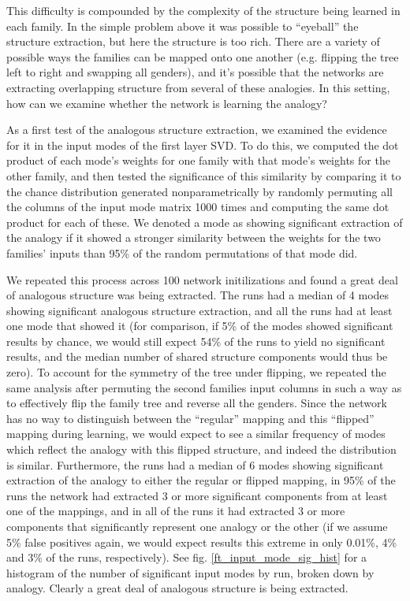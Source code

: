 \documentclass[10pt,letterpaper]{article}
\begin{document}
This difficulty is compounded by the complexity of the structure being learned in each family. In the simple problem above it was possible to ``eyeball'' the structure extraction, but here the structure is too rich. There are a variety of possible ways the families can be mapped onto one another (e.g. flipping the tree left to right and swapping all genders), and it's possible that the networks are extracting overlapping structure from several of these analogies. In this setting, how can we examine whether the network is learning the analogy? \par
As a first test of the analogous structure extraction, we examined the evidence for it in the input modes of the first layer SVD. To do this, we computed the dot product of each mode's weights for one family with that mode's weights for the other family, and then tested the significance of this similarity by comparing it to the chance distribution generated nonparametrically by randomly permuting all the columns of the input mode matrix 1000 times and computing the same dot product for each of these. We denoted a mode as showing significant extraction of the analogy if it showed a stronger similarity between the weights for the two families' inputs than 95\% of the random permutations of that mode did. \par
We repeated this process across 100 network initilizations and found a great deal of analogous structure was being extracted. The runs had a median of 4 modes showing significant analogous structure extraction, and all the runs had at least one mode that showed it (for comparison, if 5\% of the modes showed significant results by chance, we would still expect 54\% of the runs to yield no significant results, and the median number of shared structure components would thus be zero). To account for the symmetry of the tree under flipping, we repeated the same analysis after permuting the second families input columns in such a way as to effectively flip the family tree and reverse all the genders. Since the network has no way to distinguish between the ``regular'' mapping and this ``flipped'' mapping during learning, we would expect to see a similar frequency of modes which reflect the analogy with this flipped structure, and indeed the distribution is similar. Furthermore, the runs had a median of 6 modes showing significant extraction of the analogy to either the regular or flipped mapping, in 95\% of the runs the network had extracted 3 or more significant components from at least one of the mappings, and in all of the runs it had extracted 3 or more components that significantly represent one analogy or the other (if we assume 5\% false positives again, we would expect results this extreme in only 0.01\%, 4\% and 3\% of the runs, respectively). See fig. \ref{ft_input_mode_sig_hist} for a histogram of the number of significant input modes by run, broken down by analogy. Clearly a great deal of analogous structure is being extracted. \par
\end{document}
